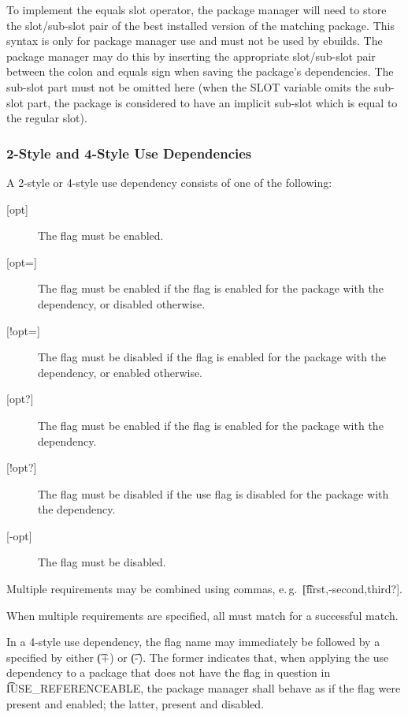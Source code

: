 To implement the equals slot operator, the package manager will need to store the slot/sub-slot
pair of the best installed version of the matching package. This syntax is only for package manager
use and must not be used by ebuilds. The package manager may do this by inserting the appropriate
slot/sub-slot pair between the colon and equals sign when saving the package's dependencies. The
sub-slot part must not be omitted here (when the SLOT variable omits the sub-slot part, the package
is considered to have an implicit sub-slot which is equal to the regular slot).

\subsubsection{2-Style and 4-Style Use Dependencies}
\label{sec:use-dep}

A 2-style or 4-style use dependency consists of one of the following:

\begin{description}
\item[{[opt]}] The flag must be enabled.
\item[{[opt=]}] The flag must be enabled if the flag is enabled for the package with the
    dependency, or disabled otherwise.
\item[{[!opt=]}] The flag must be disabled if the flag is enabled for the package with the
    dependency, or enabled otherwise.
\item[{[opt?]}] The flag must be enabled if the flag is enabled for the package with the
    dependency.
\item[{[!opt?]}] The flag must be disabled if the use flag is disabled for the package with the
    dependency.
\item[{[-opt]}] The flag must be disabled.
\end{description}

Multiple requirements may be combined using commas, e.\,g.\ \t{[first,-second,third?]}.

When multiple requirements are specified, all must match for a successful match.

 In a 4-style use dependency, the flag name may immediately be
followed by a  specified by either \t{(+)} or \t{(-)}. The former indicates that, when
applying the use dependency to a package that does not have the flag in question in
\t{IUSE\_REFERENCEABLE}, the package manager shall behave as if the flag were present and enabled;
the latter, present and disabled.

